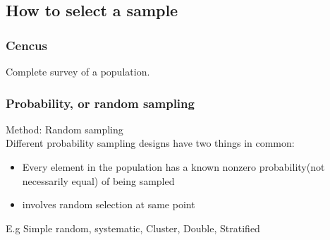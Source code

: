 \documentclass{article}
\theoremstyle{definition}
\theoremstyle{thrm}
\theoremstyle{lma}
\theoremstyle{ppst}
\theoremstyle{crlr}
\begin{document}
\subsection{How to select a sample}
\subsubsection{Cencus}
Complete survey of a population.
\subsubsection{Probability, or random sampling} 
Method: Random sampling\\
Different probability sampling designs have two things in common:
\begin{itemize}
	\item Every element in the population has a known nonzero probability(not necessarily equal) of being sampled
	\item involves random selection at same point
\end{itemize}
E.g Simple random, systematic, Cluster, Double, Stratified
\end{document}
